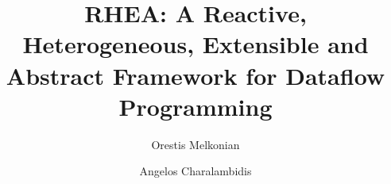 \documentclass[sigplan,review,anonymous]{acmart}\settopmatter{printfolios=true}
\begin{document}


\title[RHEA]{RHEA: A Reactive, Heterogeneous, Extensible and Abstract Framework for Dataflow Programming}         %
\subtitle{}                     %



\author{Orestis Melkonian}

\author{Angelos Charalambidis}
\end{document}
